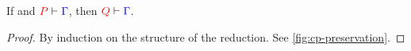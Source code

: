 \begin{theorem}[Preservation]\label{thm:cp-preservation}
  If  and $\seq[{ P }]{ \Gamma }$, then $\seq[{ Q }]{ \Gamma }$.
\end{theorem}
\begin{proof}
  By induction on the structure of the reduction. See \cref{fig:cp-preservation}.
\end{proof}
